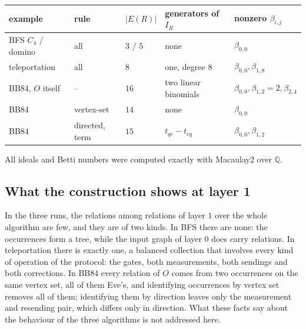 \documentclass[11pt]{article}
\begin{document}
\begin{center}
\begin{tabular}{lllll}
\hline
example & rule & $|E(R)|$ & generators of $I_R$ & nonzero $\beta_{i,j}$\\
\hline
BFS $C_4$ / domino & all & $3$ / $5$ & none & $\beta_{0,0}$\\
teleportation & all & $8$ & one, degree $8$ & $\beta_{0,0},\beta_{1,8}$\\
BB84, $O$ itself & -- & $16$ & two linear binomials & $\beta_{0,0},\beta_{1,2}{=}2,\beta_{2,4}$\\
BB84 & vertex-set & $14$ & none & $\beta_{0,0}$\\
BB84 & directed, term & $15$ & $t_{qe}-t_{eq}$ & $\beta_{0,0},\beta_{1,2}$\\
\hline
\end{tabular}
\end{center}

All ideals and Betti numbers were computed exactly with Macaulay2 over $\mathbb{Q}$.

\subsection{What the construction shows at layer 1}

In the three runs, the relations among relations of layer $1$ over the whole algorithm are few, and they are of two kinds. In BFS there are none: the occurrences form a tree, while the input graph of layer $0$ does carry relations. In teleportation there is exactly one, a balanced collection that involves every kind of operation of the protocol: the gates, both measurements, both sendings and both corrections. In BB84 every relation of $O$ comes from two occurrences on the same vertex set, all of them Eve's, and identifying occurrences by vertex set removes all of them; identifying them by direction leaves only the measurement and resending pair, which differs only in direction. What these facts say about the behaviour of the three algorithms is not addressed here.
\end{document}
